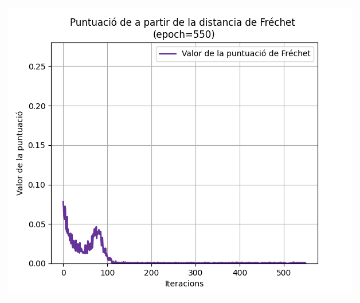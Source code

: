 \begin{figure}
\begin{subfigure}[b]{.32\linewidth}
		\includegraphics[width=\linewidth]{figures/data/FD_score_3.png}
		\caption{}
	\end{subfigure}
	

\end{figure}
